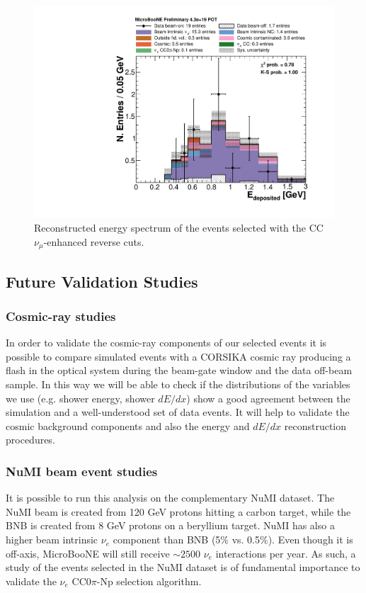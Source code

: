 \begin{figure}[htbp]
\centering
  \includegraphics[width=0.7\linewidth]{figures/numu_reco.pdf}
  \caption{Reconstructed energy spectrum of the events selected with the CC $\nu_{\mu}$-enhanced reverse cuts.}\label{fig:numu_inverted}
\end{figure}

\subsection{Future Validation Studies}

\subsubsection{Cosmic-ray studies}
In order to validate the cosmic-ray components of our selected events it is possible to compare simulated events with a CORSIKA cosmic ray producing a flash in the optical system during the beam-gate window and the data off-beam sample. 
In this way we will be able to check if the distributions of the variables we use (e.g. shower energy, shower $dE/dx$) show a good agreement between the simulation and a well-understood set of data events. 
It will help to validate the cosmic background components and also the energy and $dE/dx$ reconstruction procedures.

\subsubsection{NuMI beam event studies}
It is possible to run this analysis on the complementary NuMI dataset. The NuMI beam is created from 120 GeV protons hitting a carbon target, while the BNB is created from 8 GeV protons on a beryllium target. NuMI has also a higher beam intrinsic $\nu_{e}$ component than BNB (5\% vs. 0.5\%). Even though it is off-axis, MicroBooNE will still receive $\sim2500$ $\nu_{e}$ interactions per year. 
As such, a study of the events selected in the NuMI dataset is of fundamental importance to validate the $\nu_{e}$ CC0$\pi$-Np selection algorithm.

